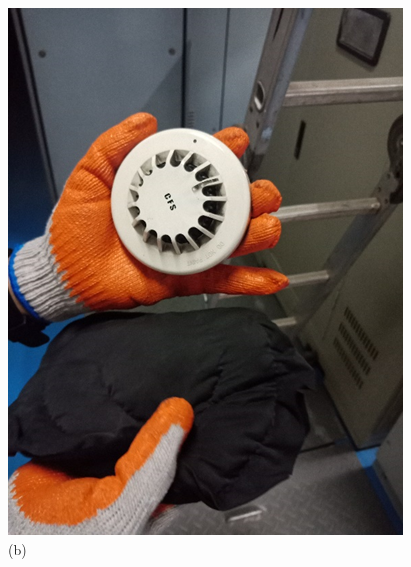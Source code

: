 \begin{figure}[h]
\begin{minipage}[b]{0.22\linewidth}
		\centering
		\includegraphics[width=\textwidth]{figures/ch02_fdas02}
		\caption*{(b)}
	\end{minipage}
	\hspace{0.05cm}
	\begin{minipage}[b]{0.22\linewidth}
		\centering

\end{minipage}
\end{figure}

